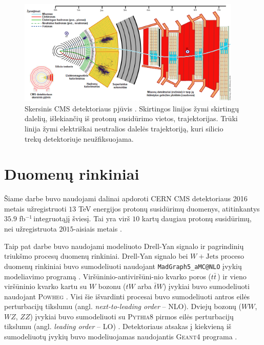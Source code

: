 \documentclass[a4paper, 12pt]{article}
\newcommand{\ttt}[1]{\texttt{#1}}
\newcommand{\WJets}{W\! +\!\mathrm{Jets}}
\newcommand{\invfb}{fb$^{-1}\,$}
\begin{document}
\begin{figure} \centering
	\includegraphics[width=0.95\textwidth]{CMSslice_LT.png}
	\caption{\label{fig:CMSslice}Skersinis CMS detektoriaus pjūvis \cite{CMSslice}.
	Skirtingos linijos žymi skirtingų dalelių, išlekiančių iš protonų susidūrimo vietos, trajektorijas.
	Trūki linija žymi elektriškai neutralios dalelės trajektoriją, kuri silicio trekų detektoriuje
	neužfiksuojama.}
\end{figure}

\section{Duomenų rinkiniai}

Šiame darbe buvo naudojami dalinai apdoroti CERN CMS detektoriaus 2016 metais užregistruoti $13$ TeV
energijos protonų susidūrimų duomenys, atitinkantys $35.9$ \invfb integruotąjį šviesį.
Tai yra virš $10$ kartų daugiau protonų susidūrimų, nei užregistruota $2015$-aisiais metais \cite{DY2018}.

Taip pat darbe buvo naudojami modeliuoto Drell-Yan signalo ir pagrindinių triukšmo procesų duomenų rinkiniai.
Drell-Yan signalo bei $\WJets$ proceso duomenų rinkiniai buvo sumodeliuoti naudojant
\ttt{MadGraph5\_aMC@NLO} įvykių modeliavimo programą \cite{MG_aMCatNLO}.
Viršūninio-antiviršūni-nio kvarko poros ($t\bar{t}\,$) ir vieno viršūninio kvarko kartu su $W$ bozonu ($tW$ arba
$\bar{t}W$) įvykiai buvo sumodeliuoti naudojant \textsc{Powheg} \cite{powheg_ttbar, powheg_tW}.
Visi šie išvardinti procesai buvo sumodeliuoti antros eilės perturbacijų tikslumu (angl.
\textit{next-to-leading order} -- NLO).
Dviejų bozonų ($WW$, $WZ$, $ZZ$) įvykiai buvo sumodeliuoti su \textsc{Pythia8} pirmos eilės perturbacijų tikslumu
(angl. \textit{leading order} -- LO) \cite{pythia82}.
Detektoriaus atsakas į kiekvieną iš sumodeliuotų įvykių buvo modeliuojamas naudojantis \textsc{Geant4} programa
\cite{geant4}.
\end{document}

